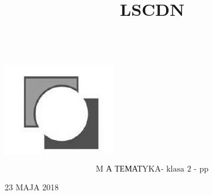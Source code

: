 \documentclass[10pt]{article}
\title{LSCDN }
\author{}
\date{}
\begin{document}
\maketitle
\(\qquad\)\\
\includegraphics[max width=\textwidth, center]{2024_11_21_b63ac6eb3d78a57ac924g-01}

\[
\text { M А ТЕМАТYKA- klasa } 2 \text { - pp }
\]

23 MAJA 2018
\end{document}
